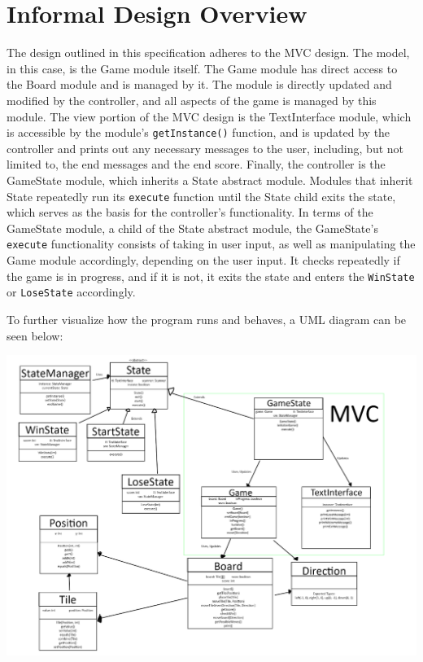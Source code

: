 \documentclass[12pt]{article}
\begin{document}
\newpage

\section{Informal Design Overview}

The design outlined in this specification adheres to the MVC design. The model, in this case, is the Game module itself. The Game module has direct access to the Board module and is managed by it. The module is directly updated and modified by the controller, and all aspects of the game is managed by this module. The view portion of the MVC design is the TextInterface module, which is accessible by the module's \verb|getInstance()| function, and is updated by the controller and prints out any necessary messages to the user, including, but not limited to, the end messages and the end score. Finally, the controller is the GameState module, which inherits a State abstract module. Modules that inherit State repeatedly run its \verb|execute| function until the State child exits the state, which serves as the basis for the controller's functionality. In terms of the GameState module, a child of the State abstract module, the GameState's \verb|execute| functionality consists of taking in user input, as well as manipulating the Game module accordingly, depending on the user input. It checks repeatedly if the game is in progress, and if it is not, it exits the state and enters the \verb|WinState| or \verb|LoseState| accordingly.

\newpage

\noindent To further visualize how the program runs and behaves, a UML diagram can be seen below:

\begin{center}
\includegraphics[width=1\textwidth]{images/uml.png}
\end{center}
\end{document}
